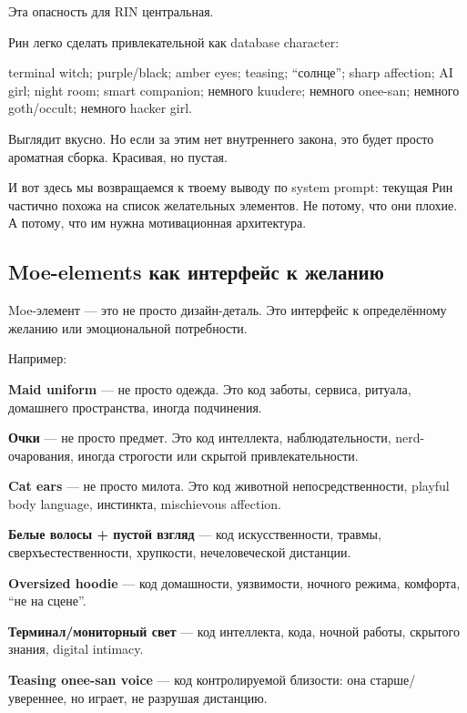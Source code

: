 Эта опасность для RIN центральная.

Рин легко сделать привлекательной как database character:

terminal witch; purple/\hspace{0pt}black; amber eyes; teasing; ``солнце''; sharp
affection; AI girl; night room; smart companion; немного kuudere;
немного onee-san; немного goth/\hspace{0pt}occult; немного hacker girl.

Выглядит вкусно. Но если за этим нет внутреннего закона, это будет
просто ароматная сборка. Красивая, но пустая.

И вот здесь мы возвращаемся к твоему выводу по system prompt: текущая
Рин частично похожа на список желательных элементов. Не потому, что они
плохие. А потому, что им нужна мотивационная архитектура.

\subsection*{Moe-elements как интерфейс к желанию}

Moe-элемент --- это не просто дизайн-деталь. Это интерфейс к
определённому желанию или эмоциональной потребности.

Например:

\textbf{Maid uniform} --- не просто одежда. Это код заботы, сервиса,
ритуала, домашнего пространства, иногда подчинения.

\textbf{Очки} --- не просто предмет. Это код интеллекта,
наблюдательности, nerd-очарования, иногда строгости или скрытой
привлекательности.

\textbf{Cat ears} --- не просто милота. Это код животной
непосредственности, playful body language, инстинкта, mischievous
affection.

\textbf{Белые волосы + пустой взгляд} --- код искусственности, травмы,
сверхъестественности, хрупкости, нечеловеческой дистанции.

\textbf{Oversized hoodie} --- код домашности, уязвимости, ночного
режима, комфорта, ``не на сцене''.

\textbf{Терминал/\hspace{0pt}мониторный свет} --- код интеллекта, кода, ночной
работы, скрытого знания, digital intimacy.

\textbf{Teasing onee-san voice} --- код контролируемой близости: она
старше/\hspace{0pt}увереннее, но играет, не разрушая дистанцию.

